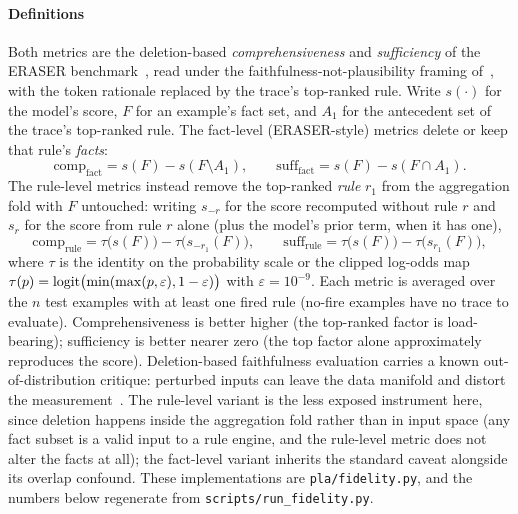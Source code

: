 \paragraph{Definitions} Both metrics are the deletion-based
\emph{comprehensiveness} and \emph{sufficiency} of the ERASER
benchmark~\cite{deyoung2020}, read under the
faithfulness-not-plausibility framing of~\cite{jacovi2020}, with the
token rationale replaced by the trace's top-ranked rule. Write
$s(\cdot)$ for the model's score, $F$ for an example's fact set, and
$A_1$ for the antecedent set of the trace's top-ranked rule. The
fact-level (ERASER-style) metrics delete or keep that rule's
\emph{facts}:
\begin{equation}
\mathrm{comp}_{\mathrm{fact}} = s(F) - s(F \setminus A_1),
\qquad
\mathrm{suff}_{\mathrm{fact}} = s(F) - s(F \cap A_1).
\label{eq:fidelity-fact}
\end{equation}
The rule-level metrics instead remove the top-ranked \emph{rule} $r_1$
from the aggregation fold with $F$ untouched: writing
$s_{-r}$ for the score recomputed without rule $r$ and $s_{r}$ for the
score from rule $r$ alone (plus the model's prior term, when it has
one),
\begin{equation}
\mathrm{comp}_{\mathrm{rule}} = \tau\bigl(s(F)\bigr) - \tau\bigl(s_{-r_1}(F)\bigr),
\qquad
\mathrm{suff}_{\mathrm{rule}} = \tau\bigl(s(F)\bigr) - \tau\bigl(s_{r_1}(F)\bigr),
\label{eq:fidelity-rule}
\end{equation}
where $\tau$ is the identity on the probability scale or the clipped
log-odds map $\tau(p) = \operatorname{logit}\bigl(\min(\max(p,\varepsilon),
1-\varepsilon)\bigr)$ with $\varepsilon = 10^{-9}$. Each metric is
averaged over the $n$ test examples with at least one fired rule
(no-fire examples have no trace to evaluate). Comprehensiveness is
better higher (the top-ranked factor is load-bearing); sufficiency is
better nearer zero (the top factor alone approximately reproduces the
score). Deletion-based faithfulness evaluation carries a known
out-of-distribution critique: perturbed inputs can leave the data
manifold and distort the measurement~\cite{zheng2025}. The rule-level
variant is the less exposed instrument here, since deletion happens
inside the aggregation fold rather than in input space (any fact
subset is a valid input to a rule engine, and the rule-level metric
does not alter the facts at all); the fact-level variant inherits the
standard caveat alongside its overlap confound. These implementations
are
\texttt{pla/fidelity.py}, and the numbers below regenerate from
\texttt{scripts/run\_fidelity.py}.

